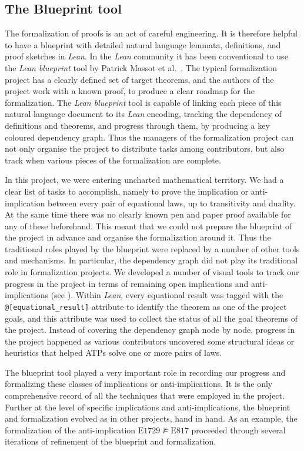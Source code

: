 \documentclass[12pt]{amsart}
\theoremstyle{definition}
\newcommand{\nmodels}{\not\models}
\newcommand{\Eq}[1]{\mathrm{E}#1}
\begin{document}
\subsection{The Blueprint tool}

The formalization of proofs is an act of careful engineering. It is therefore helpful to have a blueprint with detailed natural language lemmata, definitions, and proof sketches in \emph{Lean}. In the \emph{Lean} community it has been conventional to use the \emph{Lean blueprint} tool by Patrick Massot et al.~\cite{leanblueprint}. The typical formalization project has a clearly defined set of target theorems, and the authors of the project work with a known proof, to produce a clear roadmap for the formalization. The \emph{Lean blueprint} tool is capable of linking each piece of this natural language document to its \emph{Lean} encoding, tracking the dependency of definitions and theorems, and progress through them, by producing a key coloured dependency graph. Thus the managers of the formalization project can not only organise the project to distribute tasks among contributors, but also track when various pieces of the formalization are complete.

In this project, we were entering uncharted mathematical territory. We had a clear list of tasks to accomplish, namely to prove the implication or anti-implication between every pair of equational laws, up to transitivity and duality. At the same time there was no clearly known pen and paper proof available for any of these beforehand. This meant that we could not prepare the blueprint of the project in advance and organise the formalization around it. Thus the traditional roles played by the blueprint were replaced by a number of other tools and mechanisms. In particular, the dependency graph did not play its traditional role in formalization projects. We developed a number of visual tools to track our progress in the project in terms of remaining open implications and anti-implications (see ). Within \emph{Lean}, every equational result was tagged with the \texttt{@[equational\_result]} attribute to identify the theorem as one of the project goals, and this attribute was used to collect the status of all the goal theorems of the project. Instead of covering the dependency graph node by node, progress in the project happened as various contributors uncovered some structural ideas or heuristics that helped ATPs solve one or more pairs of laws.

The blueprint tool played a very important role in recording our progress and formalizing these classes of implications or anti-implications. It is the only comprehensive record of all the techniques that were employed in the project. Further at the level of specific implications and anti-implications, the blueprint and formalization evolved as in other projects, hand in hand. As an example, the formalization of the anti-implication  $\Eq{1729} \nmodels \Eq{817}$ proceeded through several iterations of refinement of the blueprint and formalization.
\end{document}
